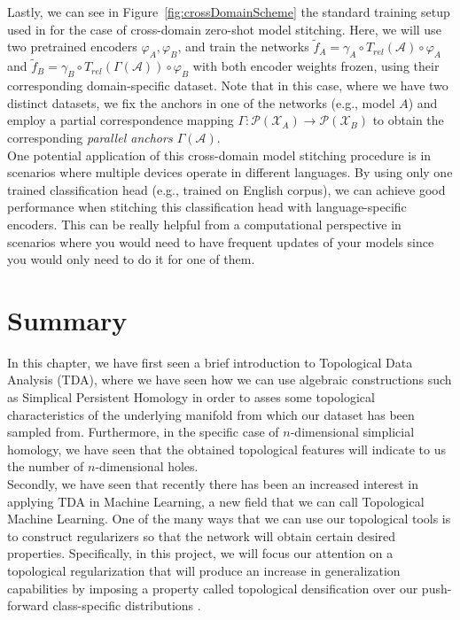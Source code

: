 \documentclass[../main.tex]{subfiles}
\begin{document}
Lastly, we can see in Figure~\ref{fig:crossDomainScheme} the standard training setup used in \cite{moschella_relative_2022} for the case of cross-domain zero-shot model stitching. Here, we will use two pretrained encoders $\varphi_A, \varphi_B$, and train the networks $\tilde{f}_{A}=\gamma_A \circ T_{rel}(\mathcal{A})  \circ \varphi_A$ and $\tilde{f}_{B}=\gamma_B \circ T_{rel}(\Gamma(\mathcal{A}))  \circ \varphi_B$ with both encoder weights frozen, using their corresponding domain-specific dataset. Note that in this case, where we have two distinct datasets, we fix the anchors in one of the networks (e.g., model $A$) and employ a partial correspondence mapping $\Gamma: \mathcal{P}(\mathcal{X}_A) \to \mathcal{P}(\mathcal{X}_B)$ to obtain the corresponding \emph{parallel anchors $\Gamma(\mathcal{A})$}.\\

One potential application of this cross-domain model stitching procedure is in scenarios where multiple devices operate in different languages. By using only one trained classification head (e.g., trained on English corpus), we can achieve good performance when stitching this classification head with language-specific encoders. This can be really helpful from a computational perspective in scenarios where you would need to have frequent updates of your models since you would only need to do it for one of them.



\section{Summary}
In this chapter, we have first seen a brief introduction to Topological Data Analysis (TDA), where we have seen how we can use algebraic constructions such as Simplical Persistent Homology in order to asses some topological characteristics of the underlying manifold from which our dataset has been sampled from. Furthermore, in the specific case of $n$-dimensional simplicial homology, we have seen that the obtained topological features will indicate to us the number of $n$-dimensional holes.\\

Secondly, we have seen that recently there has been an increased interest in applying TDA in Machine Learning, a new field that we can call Topological Machine Learning. One of the many ways that we can use our topological tools is to construct regularizers so that the network will obtain certain desired properties. Specifically, in this project, we will focus our attention on a topological regularization that will produce an increase in generalization capabilities by imposing a property called topological densification over our push-forward class-specific distributions \cite{hofer_densified_2021}.\\
\end{document}
